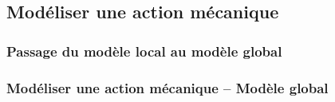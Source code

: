 \subsection{Modéliser une action mécanique}

\subsubsection{Passage du modèle local au modèle global}

\renewcommand{\repExo}{../../ExercicesCompetences/B2_ProposerModele/B2_14_ModeliserAction}

\renewcommand{\td}{39_SeineMusicale}
\graphicspath{{\repStyle/png/}{\repExo/\td/images/}}


\renewcommand{\td}{50_BancBalafre}
\graphicspath{{\repStyle/png/}{\repExo/\td/images/}}


\subsubsection{Modéliser une action mécanique -- Modèle global}

\renewcommand{\repExo}{../../ExercicesCompetences/B2_ProposerModele/B2_14_ModeliserAction_ModeleGlobal}

\renewcommand{\td}{516_MAM}
\graphicspath{{\repStyle/png/}{\repExo/\td/images/}}


\renewcommand{\td}{517_MAM}
\graphicspath{{\repStyle/png/}{\repExo/\td/images/}}


\renewcommand{\td}{518_MAM}
\graphicspath{{\repStyle/png/}{\repExo/\td/images/}}


\renewcommand{\td}{519_MAM}
\graphicspath{{\repStyle/png/}{\repExo/\td/images/}}


\renewcommand{\td}{520_MAM}
\graphicspath{{\repStyle/png/}{\repExo/\td/images/}}


\renewcommand{\td}{521_MAM}
\graphicspath{{\repStyle/png/}{\repExo/\td/images/}}
